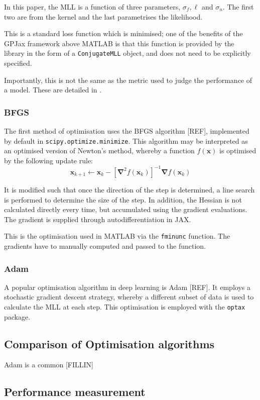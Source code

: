 \documentclass[12pt,a4paper,twoside]{report}
\theoremstyle{definition}
\begin{document}
In this paper, the MLL is a function of three parameters, $\sigma_f, \ell$ and $\sigma_n$. The first two are from the kernel and the last parametrises the likelihood.

This is a standard loss function which is minimised; one of the benefits of the GPJax framework above MATLAB is that this function is provided by the library in the form of a \texttt{ConjugateMLL} object, and does not need to be explicitly specified.

Importantly, this is not the same as the metric used to judge the performance of a model. These are detailed in .

\subsubsection{BFGS}
The first method of optimisation uses the BFGS algorithm [REF], implemented by default in \texttt{scipy.optimize.minimize}. This algorithm may be interpreted as an optimised version of Newton's method, whereby a function $f(\mathbf x)$ is optimised by the following update rule:
$$\mathbf x_{k+1} \gets \mathbf x_k - [\boldsymbol \nabla^2 f (\mathbf x_k)]^{-1} \boldsymbol \nabla f(\mathbf x_k)$$

It is modified such that once the direction of the step is determined, a line search is performed to determine the size of the step. In addition, the Hessian is not calculated directly every time, but accumulated using the gradient evaluations. The gradient is supplied through autodifferentiation in JAX.

This is the optimisation used in MATLAB via the \texttt{fminunc} function. The gradients have to manually computed and passed to the function.

\subsubsection{Adam}
A popular optimisation algorithm in deep learning is Adam [REF]. It employs a stochastic gradient descent strategy, whereby a different subset of data is used to calculate the MLL at each step. This optimisation is employed with the \texttt{optax} package.

\subsection{Comparison of Optimisation algorithms}
Adam is a common [FILLIN]

\subsection{Performance measurement}\label{performance}
\end{document}
